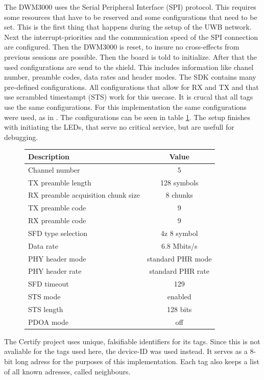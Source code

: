 The DWM3000 uses the Serial Peripheral Interface (SPI) protocol.
This requires some resources that have to be reserved and some configurations that need to be set.
This is the first thing that happens during the setup of the UWB network.
Next the interrupt-priorities and the communication speed of the SPI connection are configured.
Then the DWM3000 is reset, to insure no cross-effects from previous sessions are possible.
Then the board is told to initialize.
After that the used configurations are send to the shield.
This includes information like chanel number, preamble codes, data rates and header modes.
The SDK contains many pre-defined configurations.
All configurations that allow for RX and TX and that use scrambled timestampt (STS) work for this usecase.
It is crucal that all tags use the same configurations.
For this implementation the same configurations were used, as in \cite{degkwitz2023ultrawideband}.
The configurations can be seen in table \ref{table:DWM_settings}.
The setup finishes with initiating the LEDs, that serve no critical service, but are usefull for debugging.



\begin{figure}[ht]
\caption{Configurations of the DWM3000 for UWB communication}
\begin{longtable}{|l|c|}
\hline
\textbf{Description} & \textbf{Value} \\
\hline
\endfirsthead
\hline
\endfoot
Channel number & 5 \\
TX preamble length & 128 symbols \\
RX preamble acquisition chunk size & 8 chunks \\
TX preamble code & 9 \\
RX preamble code & 9 \\
SFD type selection & 4z 8 symbol\\
Data rate & 6.8 Mbits/s \\
PHY header mode & standard PHR mode \\
PHY header rate & standard PHR rate \\
SFD timeout & 129 \\
STS mode & enabled \\
STS length & 128 bits \\
PDOA mode & off \\
\hline
\end{longtable}
\label{table:DWM_settings}
\end{figure}


The Certify project uses unique, falsifiable identifiers for its tags.
Since this is not avaliable for the tags used here, the device-ID was used instead.
It serves as a 8-bit long adress for the purposes of this implementation.
Each tag also keeps a list of all known adresses, called neighbours.


